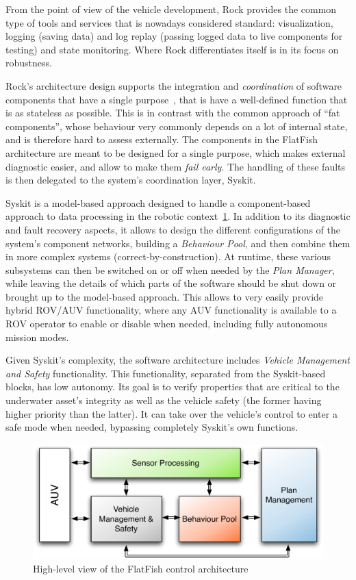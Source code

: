 \documentclass[conference]{IEEEtran}
\begin{document}
From the point of view of the vehicle development, Rock provides the common type of tools
and services that is nowadays considered standard: visualization, logging (saving data)
and log replay (passing logged data to live components for testing) and state monitoring.
Where Rock differentiates itself is in its focus on robustness.

Rock's architecture design supports the integration and \emph{coordination} of software
components that have a single purpose~\cite{Joyeux2013}, that is have a well-defined 
function that is as
stateless as possible. This is in contrast with the common approach of ``fat components'',
whose behaviour very commonly depends on a lot of internal state, and is therefore hard to
assess externally. The components in the FlatFish architecture are meant to be designed
for a single purpose, which makes external diagnostic easier, and allow to make them
\emph{fail early}. The handling of these faults is then delegated to the system's
coordination layer, Syskit\cite{Joyeux2011}.

Syskit is a model-based approach designed to handle a component-based approach to 
data
processing in the robotic context~\ref{fig:sw_arch}. In addition to its diagnostic and fault 
recovery
aspects, it allows to design the different configurations of the system's component
networks, building a \emph{Behaviour Pool}, and then combine them in more complex 
systems
(correct-by-construction). At runtime, these various subsystems can then be switched on or
off when needed by the \emph{Plan Manager}, while leaving the details of which parts of
the software should be shut down or brought up to the model-based approach. This allows 
to
very easily provide hybrid ROV/AUV functionality, where any AUV functionality is available
to a ROV operator to enable or disable when needed, including fully autonomous mission
modes.

Given Syskit's complexity, the software architecture includes \emph{Vehicle Management
and Safety} functionality. This functionality, separated from the Syskit-based blocks, has
low autonomy. Its goal is to verify properties that are critical to the underwater asset's
integrity as well as the vehicle safety (the former having higher priority than the
latter). It can take over the vehicle's control to enter a safe mode when needed,
bypassing completely Syskit's own functions.

\begin{figure}[!t]
	\centering
	\includegraphics[width=0.9\columnwidth]{sw_arch_overview}
	\caption{High-level view of the FlatFish control architecture}
	\label{fig:sw_arch}
\end{figure}
\end{document}
